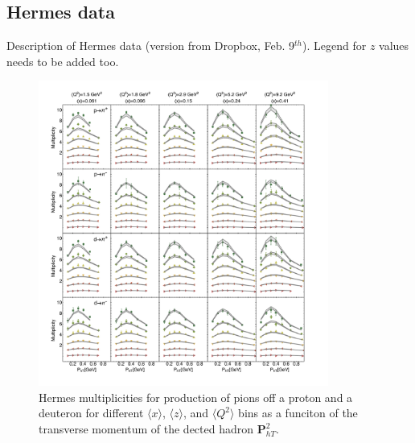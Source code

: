 \documentclass[aps,preprintnumbers,showpacs,nofootinbib,superscriptaddress,floatfix]{revtex4}
\begin{document}
\subsection{Hermes data}
\label{ss:hermes}

Description of Hermes data (version from Dropbox, Feb. 9$^{th}$).
Legend for $z$ values needs to be added too.
\begin{figure}[h!]
\begin{center}
\includegraphics[width=0.85\textwidth]{plots/Hermes/Hermes_Pions_SCIplot_flINDEP.pdf}
\end{center}
\caption{Hermes multiplicities for production of pions off a proton and a deuteron for different $\langle x \rangle$, $\langle z \rangle$, and $\langle Q^2 \rangle$ bins as a funciton of the transverse momentum of the dected hadron ${\bm P}_{hT}^ 2$.} 
\label{f:H_pions}
\end{figure}
\end{document}
